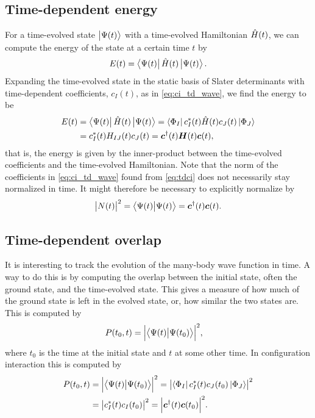         \subsection{Time-dependent energy}
            For a time-evolved state $\ket{\Psi(t)}$ with a time-evolved
            Hamiltonian $\hat{H}(t)$, we can compute the energy of the state at a
            certain time $t$ by
            \begin{align}
                E(t) = \bra{\Psi(t)}\hat{H}(t)\ket{\Psi(t)}.
            \end{align}
            Expanding the time-evolved state in the static basis of Slater
            determinants with time-dependent coefficients, $c_I(t)$, as in
            \autoref{eq:ci_td_wave}, we find the energy to be
            \begin{align}
                E(t)
                &= \bra{\Psi(t)}\hat{H}(t)\ket{\Psi(t)}
                = \bra{\Phi_I}c^{*}_I(t) \hat{H}(t) c_J(t)\ket{\Phi_J}
                \\
                &= c^{*}_I(t) H_{IJ}(t) c_J(t)
                = \boldsymbol{c}^{\dagger}(t)\boldsymbol{H}(t)\boldsymbol{c}(t),
            \end{align}
            that is, the energy is given by the inner-product between the
            time-evolved coefficients and the time-evolved Hamiltonian.
            Note that the norm of the coefficients in \autoref{eq:ci_td_wave}
            found from \autoref{eq:tdci} does not necessarily stay normalized in
            time.
            It might therefore be necessary to explicitly normalize by
            \begin{align}
                \abs{N(t)}^2
                = \braket{\Psi(t)}{\Psi(t)}
                = \boldsymbol{c}^{\dagger}(t)\boldsymbol{c}(t).
            \end{align}

        \subsection{Time-dependent overlap}
            It is interesting to track the evolution of the many-body wave
            function in time. A way to do this is by computing the overlap
            between the initial state, often the ground state, and the
            time-evolved state. This gives a measure of how much of the ground
            state is left in the evolved state, or, how similar the two states
            are. This is computed by
            \begin{align}
                P(t_0, t)
                &= \abs{\braket{\Psi(t)}{\Psi(t_0)}}^2,
            \end{align}
            where $t_0$ is the time at the initial state and $t$ at some other
            time. In configuration interaction this is computed by
            \begin{align}
                P(t_0, t)
                &= \abs{\braket{\Psi(t)}{\Psi(t_0)}}^2
                = \abs{\bra{\Phi_I}c^{*}_I(t) c_J(t_0)\ket{\Phi_J}}^2
                \\
                &= \abs{c^{*}_I(t)c_I(t_0)}^2
                = \abs{\boldsymbol{c}^{\dagger}(t)\boldsymbol{c}(t_0)}^2.
            \end{align}

